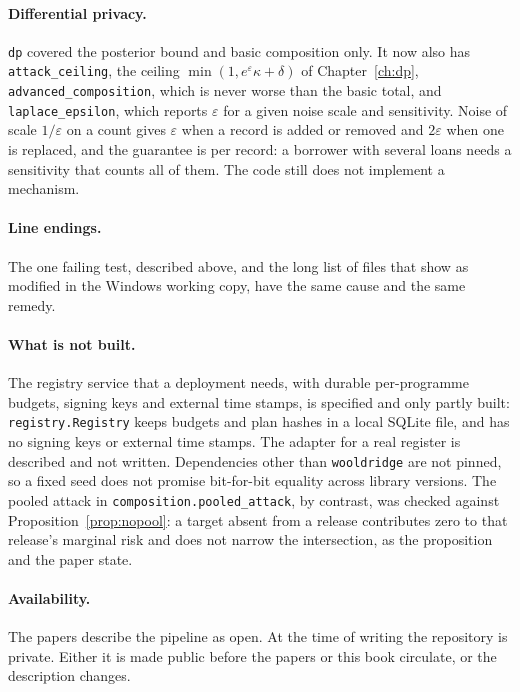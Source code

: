 \paragraph{Differential privacy.} \texttt{dp} covered the posterior bound and basic composition only. It now
also has \texttt{attack\_ceiling}, the ceiling $\min(1,e^{\varepsilon}\kappa+\delta)$ of Chapter~\ref{ch:dp},
\texttt{advanced\_composition}, which is never worse than the basic total, and \texttt{laplace\_epsilon}, which
reports $\varepsilon$ for a given noise scale and sensitivity. Noise of scale $1/\varepsilon$ on a count gives $\varepsilon$ when a
record is added or removed and $2\varepsilon$ when one is replaced, and the guarantee is per record: a borrower with several loans
needs a sensitivity that counts all of them. The code still does not implement a mechanism.

\paragraph{Line endings.} The one failing test, described above, and the long list of
files that show as modified in the Windows working copy, have the same cause and the
same remedy.

\paragraph{What is not built.} The registry service that a deployment needs, with
durable per-programme budgets, signing keys and external time stamps, is specified and
only partly built: \texttt{registry.Registry} keeps budgets and plan hashes in a local SQLite file, and has no signing keys or external time stamps. The adapter for a real register is described and not written. Dependencies
other than \texttt{wooldridge} are not pinned, so a fixed seed does not promise
bit-for-bit equality across library versions. %
The pooled attack in \texttt{composition.\allowbreak{}pooled\_\allowbreak{}attack}, by contrast, was checked
against Proposition~\ref{prop:nopool}: a target absent from a release contributes zero
to that release's marginal risk and does not narrow the intersection, as the
proposition and the paper state.

\paragraph{Availability.} The papers describe the pipeline as open. At the time of
writing the repository is private. Either it is made public before the papers or this
book circulate, or the description changes.

